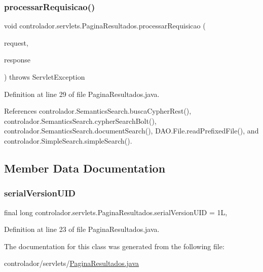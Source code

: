 \subsubsection{\texorpdfstring{processar\+Requisicao()}{processarRequisicao()}}
{\footnotesize\ttfamily void controlador.\+servlets.\+Pagina\+Resultados.\+processar\+Requisicao (\begin{DoxyParamCaption}\item[{Http\+Servlet\+Request}]{request,  }\item[{Http\+Servlet\+Response}]{response }\end{DoxyParamCaption}) throws Servlet\+Exception\hspace{0.3cm}{\ttfamily [private]}}



Definition at line 29 of file Pagina\+Resultados.\+java.



References controlador.\+Semantics\+Search.\+busca\+Cypher\+Rest(), controlador.\+Semantics\+Search.\+cypher\+Search\+Bolt(), controlador.\+Semantics\+Search.\+document\+Search(), D\+A\+O.\+File.\+read\+Prefixed\+File(), and controlador.\+Simple\+Search.\+simple\+Search().



\subsection{Member Data Documentation}
\hypertarget{classcontrolador_1_1servlets_1_1PaginaResultados_a34b97ed1f44305439397ece4c6117929}{}\label{classcontrolador_1_1servlets_1_1PaginaResultados_a34b97ed1f44305439397ece4c6117929} 
\subsubsection{\texorpdfstring{serial\+Version\+U\+ID}{serialVersionUID}}
{\footnotesize\ttfamily final long controlador.\+servlets.\+Pagina\+Resultados.\+serial\+Version\+U\+ID = 1L\hspace{0.3cm}{\ttfamily [static]}, {\ttfamily [private]}}



Definition at line 23 of file Pagina\+Resultados.\+java.



The documentation for this class was generated from the following file\+:\begin{DoxyCompactItemize}
\item 
controlador/servlets/\hyperlink{PaginaResultados_8java}{Pagina\+Resultados.\+java}\end{DoxyCompactItemize}
